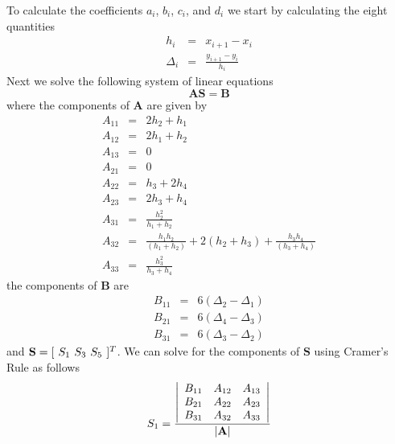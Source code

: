 To calculate the coefficients $a_i$, $b_i$, $c_i$, and $d_i$ we
start by calculating the eight quantities
%
\begin{eqnarray}
     h_i      &=& x_{i+1} - x_i\\
     \Delta_i &=& \displaystyle\frac{y_{i+1} - y_i}{h_i}
\end{eqnarray}
%
Next we solve the following system of linear equations
%
\begin{equation}
     \mathbf{A}\mathbf{S} = \mathbf{B}
\end{equation}
%
where the components of $\mathbf{A}$ are given by
%
\begin{eqnarray}
     A_{11} &=& 2h_2 + h_1 \\
     A_{12} &=& 2h_1 + h_2 \\
     A_{13} &=& 0 \\
     A_{21} &=& 0 \\
     A_{22} &=& h_3 + 2h_4 \\
     A_{23} &=& 2h_3 + h_4 \\
     A_{31} &=& \displaystyle\frac{h_2^2}{h_1 + h_2} \\
     A_{32} &=& \displaystyle\frac{h_1h_2}{( h_1 + h_2 )} + 2( h_2 + h_3 ) + \displaystyle\frac{h_3h_4}{( h_3 + h_4
     )}\\
     A_{33} &=& \displaystyle\frac{h_3^2}{h_3 + h_4}
\end{eqnarray}
%
the components of $\mathbf{B}$ are
%
\begin{eqnarray}
    B_{11} &=& 6( \Delta_2 - \Delta_1 )\\
    B_{21} &=& 6( \Delta_4 - \Delta_3 )\\
    B_{31} &=& 6( \Delta_3 - \Delta_2 )
\end{eqnarray}
%
and $\mathbf{S} = [\hspace{.05 in} S_1 \hspace{.05 in} S_3
\hspace{.05 in} S_5 \hspace{.05 in}]^T$. We can solve for the
components of $\mathbf{S}$ using Cramer's Rule as follows
%
\begin{equation}
    S_1 = \frac{
    \left|%
    \begin{array}{ccc}
       B_{11} & A_{12} & A_{13} \\
       B_{21} & A_{22} & A_{23} \\
       B_{31} & A_{32} & A_{33} \\
    \end{array}%
    \right|
    }
    {\mathbf{| \mathbf{A}|}}
\end{equation}
